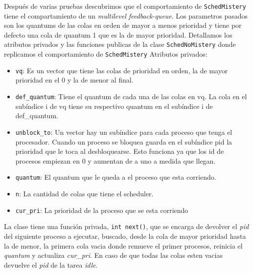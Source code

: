 Después de varias pruebas descubrimos que el comportamiento de \texttt{SchedMistery} tiene el compartamiento de un \emph{multilevel feedback-queue}. Los parametros pasados son los quantums de las colas en orden de mayor a menos prioridad y tiene por defecto una cola de quantum 1 que es la de mayor prioridad.
\newline Detallamos los atributos privados y las funciones publicas de la clase \texttt{SchedNoMistery} donde replicamos el comportamiento de \texttt{SchedMistery}
Atributos privados:
\begin{itemize}
	\item \texttt{vq}: Es un vector que tiene las colas de prioridad en orden, la de mayor prioridad en el 0 y la de menor al final.
	\item \texttt{def\_quantum}: Tiene el quantum de cada una de las colas en vq. La cola en el subíndice i de vq tiene su respectivo quantum en el subíndice i de def\_quantum. 
	\item \texttt{unblock\_to}: Un vector hay un subíndice para cada proceso que tenga el procesador. Cuando un proceso se bloquea guarda en el subíndice pid la prioridad que le toca al desbloquearse. Esto funciona ya que los id de procesos empiezan en 0 y aumentan de a uno a medida que llegan.
	\item \texttt{quantum}: El quantum que le queda a el proceso que esta corriendo.
	\item \texttt{n}: La  cantidad de colas que tiene el scheduler.
	\item \texttt{cur\_pri}: La prioridad de la proceso que se esta corriendo
\end{itemize}

La clase tiene una función privada, \texttt{int next()}, que se encarga de devolver el \emph{pid} del siguiente proceso a ejecutar, buscado, desde la cola de mayor prioridad hasta la de menor, la primera cola vacia donde remueve el primer procesos, reinicia el \emph{quantum} y actualiza \emph{cur\_pri}. En caso de que todas las colas esten vacias devuelve el \emph{pid} de la tarea \emph{idle}.

